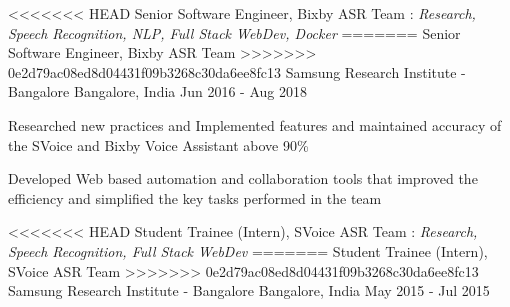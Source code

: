 

\begin{cventries}

  \cventry
<<<<<<< HEAD
    {Senior Software Engineer, Bixby ASR Team : \textit{Research, Speech Recognition, NLP, Full Stack WebDev, Docker}} %
=======
    {Senior Software Engineer, Bixby ASR Team} %
>>>>>>> 0e2d79ac08ed8d04431f09b3268c30da6ee8fc13
    {Samsung Research Institute - Bangalore} %
    {Bangalore, India} %
    {Jun 2016 - Aug 2018} %
    {
      \begin{cvitems}
      \item{Researched new practices and Implemented features and maintained accuracy of the SVoice and Bixby Voice Assistant above 90\%}
      \item{Developed Web based automation and collaboration tools that improved the efficiency and simplified the key tasks performed in the team}
      \end{cvitems}
    }

  \cventry
<<<<<<< HEAD
    {Student Trainee (Intern), SVoice ASR Team : \textit{Research, Speech Recognition, Full Stack WebDev}} %
=======
    {Student Trainee (Intern), SVoice ASR Team} %
>>>>>>> 0e2d79ac08ed8d04431f09b3268c30da6ee8fc13
    {Samsung Research Institute - Bangalore} %
    {Bangalore, India} %
    {May 2015 - Jul 2015} %
    {
    }


\end{cventries}
